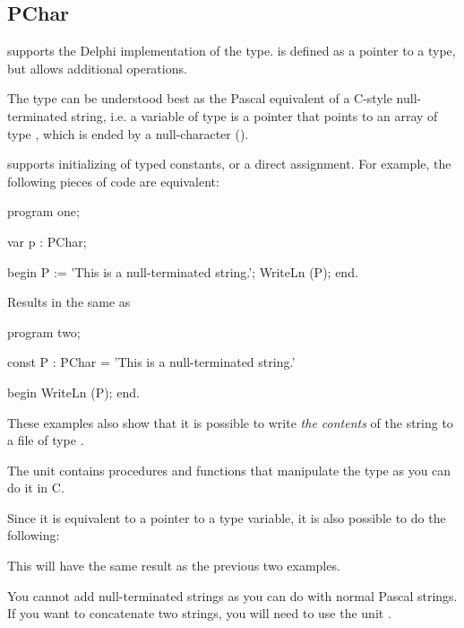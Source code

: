 \documentclass{report}
\begin{document}
\subsection{PChar}

\fpc supports the Delphi implementation of the  type. 
is defined as a pointer to a  type, but allows additional
operations.

The  type can be understood best as the Pascal equivalent of a
C-style null-terminated string, i.e. a variable of type  is a 
pointer that points to an array of type , which is ended by a
null-character ().

\fpc supports initializing of  typed constants, or a direct
assignment. For example, the following pieces of code are equivalent:

\begin{listing}
program one;

var p : PChar;

begin
  P := 'This is a null-terminated string.';
  WriteLn (P);
end.
\end{listing}
Results in the same as
\begin{listing}
program two;

const P : PChar = 'This is a null-terminated string.'

begin
  WriteLn (P);
end.
\end{listing}

These examples also show that it is possible to write {\em the contents} of
the string to a file of type .

The \seestrings unit contains procedures and functions that manipulate the
 type as you can do it in C.

Since it is equivalent to a pointer to a type  variable, it  is
also possible to do the following:
This will have the same result as the previous two examples.

You cannot add null-terminated strings as you can do with normal Pascal
strings. If you want to concatenate two  strings, you will need
to use the unit \seestrings.
\end{document}
